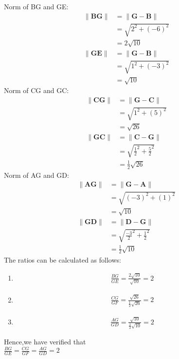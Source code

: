 \documentclass[journal,12pt,onecolumn]{IEEEtran}
\theoremstyle{remark}
\begin{document}
Norm of BG and GE:
\begin{align}
\|\mathbf{BG}\|&=\|\mathbf{G-B}\|\\
               &=\sqrt{2^2+(-6)^2}\\
               &=2\sqrt{10}\\
\|\mathbf{GE}\|&=\|\mathbf{G-B}\|\\
               &=\sqrt{1^2+(-3)^2}\\
               &=\sqrt{10}
\end{align}
Norm of CG and GC:\\
\begin{align}
\|\mathbf{CG}\|&=\|\mathbf{G-C}\|\\
               &=\sqrt{1^2+(5)^2}\\
               &=\sqrt{26}\\
\|\mathbf{GC}\|&=\|\mathbf{C-G}\|\\
               &=\sqrt{\frac{1}{2}^2+\frac{5}{2}^2}\\
               &=\frac{1}{2}\sqrt{26}
\end{align}
Norm of AG and GD:\\
\begin{align}
\|\mathbf{AG}\|&=\|\mathbf{G-A}\|\\
               &=\sqrt{(-3)^2+(1)^2}\\
               &=\sqrt{10}\\
\|\mathbf{GD}\|&=\|\mathbf{D-G}\|\\
               &=\sqrt{\frac{-3}{2}^2+\frac{1}{2}^2}\\
               &=\frac{1}{2}\sqrt{10}
\end{align}
The ratios can be calculated as follows:\\
\begin{enumerate} 
\item
\begin{align}
\frac{BG}{GE} =\frac{2\sqrt{10}}{\sqrt{10}}=2
\end{align}
\item 
\begin{align}
\frac{CG}{GF}=\frac{\sqrt{26}}{\frac{1}{2}\sqrt{26}}=2
\end{align}
\item 
\begin{align}
\frac{AG}{GD}=\frac{\sqrt{10}}{\frac{1}{2}\sqrt{10}}=2
\end{align}
\end{enumerate}
Hence,we have verified that \\
$\frac{BG}{GE}=\frac{CG}{GF}=\frac{AG}{GD}=2$
\end{document}
